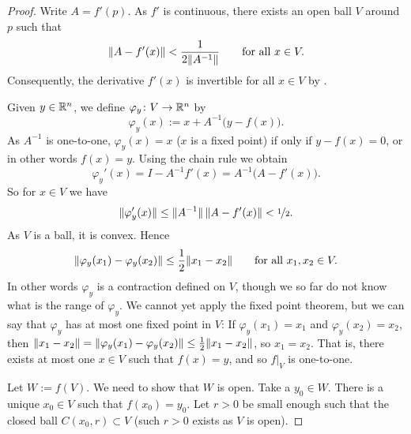 \begin{proof}
Write $A = f'(p)$.  As $f'$ is continuous, there exists an open ball
$V$ around $p$ such that
\begin{equation*}
\lVert {A-f'(x)} \rVert < \frac{1}{2\lVert {A^{-1}} \rVert}
\qquad \text{for all } x \in V.
\end{equation*}
Consequently, the derivative $f'(x)$ is invertible for all $x \in V$
by .

Given $y \in {\mathbb{R}}^n$, we define $\varphi_y \colon V \to {\mathbb{R}}^n$ by
\begin{equation*}
\varphi_y (x) := x + A^{-1}\bigl(y-f(x)\bigr) .
\end{equation*}
As $A^{-1}$ is one-to-one,
$\varphi_y(x) = x$ ($x$ is a fixed point) if only if
$y-f(x) = 0$, or in other words $f(x)=y$.  Using the chain rule we obtain
\begin{equation*}
\varphi_y'(x) = I - A^{-1} f'(x) = A^{-1} \bigl( A-f'(x) \bigr) .
\end{equation*}
So for $x \in V$ we have
\begin{equation*}
\lVert {\varphi_y'(x)} \rVert \leq \lVert {A^{-1}} \rVert \, \lVert {A-f'(x)} \rVert < \nicefrac{1}{2} .
\end{equation*}
As $V$ is a ball, it is convex.  Hence
\begin{equation*}
\lVert {\varphi_y(x_1)-\varphi_y(x_2)} \rVert \leq \frac{1}{2} \lVert {x_1-x_2} \rVert 
\qquad
\text{for all } x_1,x_2 \in V.
\end{equation*}
In other words $\varphi_y$ is a contraction defined on $V$, though we so far
do not know what is the range of $\varphi_y$.  We cannot yet
apply the fixed
point theorem, but we can say that $\varphi_y$ 
has at most one fixed point in $V$:
If $\varphi_y(x_1) = x_1$ and
$\varphi_y(x_2) = x_2$, then
$\lVert {x_1-x_2} \rVert = \lVert {\varphi_y(x_1)-\varphi_y(x_2)} \rVert \leq
\frac{1}{2} \lVert {x_1-x_2} \rVert$, so $x_1 = x_2$.
That is, there exists at most one $x \in V$
such that $f(x) = y$, and so $f|_V$ is one-to-one.

Let $W := f(V)$.  We need to show that $W$ is open.  Take a $y_0 \in W$.
There is a unique $x_0 \in V$ such that $f(x_0) = y_0$.
Let $r > 0$ be small enough such that the closed ball $C(x_0,r) \subset V$
(such $r > 0$ exists as $V$ is open).


\end{proof}
